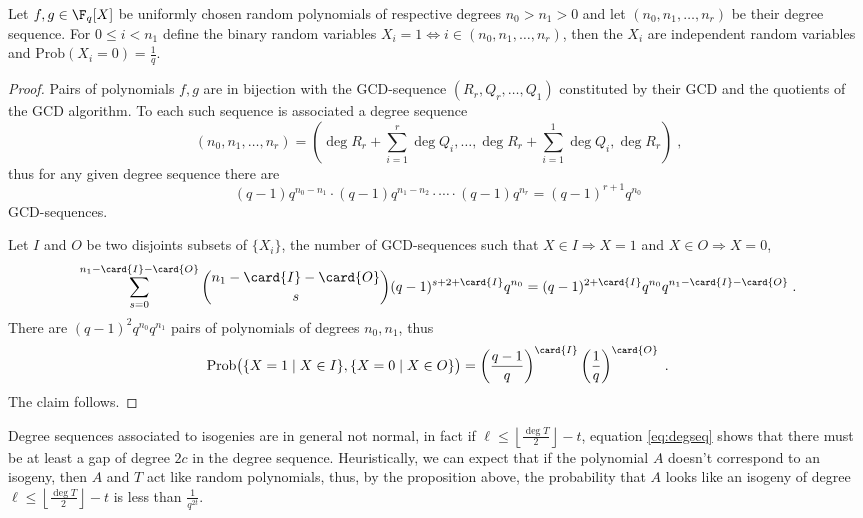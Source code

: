 \begin{proposition}
  \label{th:normseq}
  Let $f,g\in\F_q[X]$ be uniformly chosen random polynomials of
  respective degrees $n_0>n_1>0$ and let $(n_0, n_1, \ldots, n_r)$ be
  their degree sequence. For $0\le i < n_1$ define the binary random
  variables $X_i = 1 \Leftrightarrow i\in(n_0,n_1,\ldots,n_r)$, then
  the $X_i$ are independent random variables and $\mathrm{Prob}(X_i=0) =
  \frac{1}{q}$.
\end{proposition}
\begin{proof}
  Pairs of polynomials $f,g$ are in bijection with the GCD-sequence
  $(R_r, Q_r, \ldots, Q_1)$ constituted by their GCD and the quotients
  of the GCD algorithm. To each such sequence is associated a degree
  sequence
  \begin{equation*}
    (n_0,n_1,\ldots,n_r) =
    \left(\deg R_r + \sum_{i=1}^r\deg Q_i, \ldots, \deg R_r + \sum_{i=1}^1\deg Q_i, \deg R_r\right)
    \;\text{,} 
  \end{equation*}
  thus for any given degree sequence there are
  \begin{equation*}
    (q-1)q^{n_0-n_1}\cdot(q-1)q^{n_1-n_2}\cdot\cdots\cdot(q-1)q^{n_r} =
    (q-1)^{r+1}q^{n_0}
  \end{equation*}
  GCD-sequences.
 
  Let $I$ and $O$ be two disjoints subsets of $\{X_i\}$, the number of
  GCD-sequences such that $X\in I \Rightarrow X=1$ and $X\in O
  \Rightarrow X=0$,
  \begin{equation*}
     \sum_{s=0}^{n_1-\card{I}-\card{O}}\binom{n_1-\card{I}-\card{O}}{s}(q-1)^{s+2+\card{I}}q^{n_0} =
    (q-1)^{2+\card{I}}q^{n_0}q^{n_1-\card{I}-\card{O}}
    \;\text{.}
  \end{equation*}
  There are $(q-1)^2q^{n_0}q^{n_1}$ pairs of polynomials of degrees
  $n_0,n_1$, thus
  \begin{equation}
   \label{th:normseq:prob}
    \mathrm{Prob}\bigl(\{X = 1 \mid X\in I\},
    \{X=0\mid X\in O\}\bigr) = \left(\frac{q-1}{q}\right)^{\card{I}}\left(\frac{1}{q}\right)^{\card{O}}
    \;\text{.}
  \end{equation}
  The claim follows.
\end{proof}

Degree sequences associated to isogenies are in general not normal, in
fact if $\ell\le\left\lfloor\frac{\deg T}{2}\right\rfloor-t$, equation
\eqref{eq:degseq} shows that there must be at least a gap of degree
$2c$ in the degree sequence. Heuristically, we can expect that if the
polynomial $A$ doesn't correspond to an isogeny, then $A$ and $T$ act
like random polynomials, thus, by the proposition above, the
probability that $A$ looks like an isogeny of degree
$\ell\le\left\lfloor\frac{\deg T}{2}\right\rfloor-t$ is less than $\frac{1}{q^{2t}}$.

